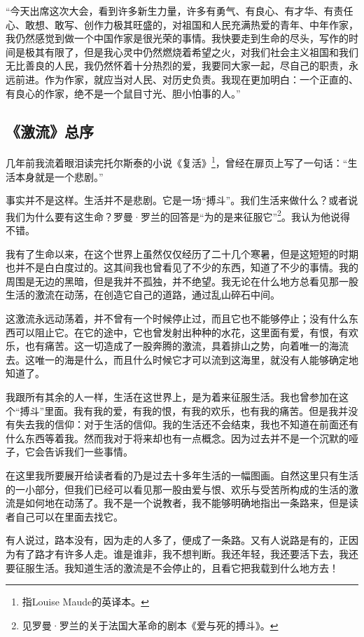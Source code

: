\par “今天出席这次大会，看到许多新生力量，许多有勇气、有良心、有才华、有责任心、敢想、敢写、创作力极其旺盛的，对祖国和人民充满热爱的青年、中年作家，我仍然感觉到做一个中国作家是很光荣的事情。我快要走到生命的尽头，写作的时间是极其有限了，但是我心灵中仍然燃烧着希望之火，对我们社会主义祖国和我们无比善良的人民，我仍然怀着十分热烈的爱，我要同大家一起，尽自己的职责，永远前进。作为作家，就应当对人民、对历史负责。我现在更加明白：一个正直的、有良心的作家，绝不是一个鼠目寸光、胆小怕事的人。”
\par {}
\par {}

\subsection{《激流》总序}


\par 几年前我流着眼泪读完托尔斯泰的小说《复活》\footnote{指Louise Maude的英译本。}，曾经在扉页上写了一句话：“生活本身就是一个悲剧。”
\par 事实并不是这样。生活并不是悲剧。它是一场“搏斗”。我们生活来做什么？或者说我们为什么要有这生命？罗曼·罗兰的回答是“为的是来征服它”\footnote{见罗曼·罗兰的关于法国大革命的剧本《爱与死的搏斗》。}。我认为他说得不错。
\par 我有了生命以来，在这个世界上虽然仅仅经历了二十几个寒暑，但是这短短的时期也并不是白白度过的。这其间我也曾看见了不少的东西，知道了不少的事情。我的周围是无边的黑暗，但是我并不孤独，并不绝望。我无论在什么地方总看见那一股生活的激流在动荡，在创造它自己的道路，通过乱山碎石中间。
\par 这激流永远动荡着，并不曾有一个时候停止过，而且它也不能够停止；没有什么东西可以阻止它。在它的途中，它也曾发射出种种的水花，这里面有爱，有恨，有欢乐，也有痛苦。这一切造成了一股奔腾的激流，具着排山之势，向着唯一的海流去。这唯一的海是什么，而且什么时候它才可以流到这海里，就没有人能够确定地知道了。
\par 我跟所有其余的人一样，生活在这世界上，是为着来征服生活。我也曾参加在这个“搏斗”里面。我有我的爱，有我的恨，有我的欢乐，也有我的痛苦。但是我并没有失去我的信仰：对于生活的信仰。我的生活还不会结束，我也不知道在前面还有什么东西等着我。然而我对于将来却也有一点概念。因为过去并不是一个沉默的哑子，它会告诉我们一些事情。
\par 在这里我所要展开给读者看的乃是过去十多年生活的一幅图画。自然这里只有生活的一小部分，但我们已经可以看见那一股由爱与恨、欢乐与受苦所构成的生活的激流是如何地在动荡了。我不是一个说教者，我不能够明确地指出一条路来，但是读者自己可以在里面去找它。
\par 有人说过，路本没有，因为走的人多了，便成了一条路。又有人说路是有的，正因为有了路才有许多人走。谁是谁非，我不想判断。我还年轻，我还要活下去，我还要征服生活。我知道生活的激流是不会停止的，且看它把我载到什么地方去！
\par {}
\par {}



